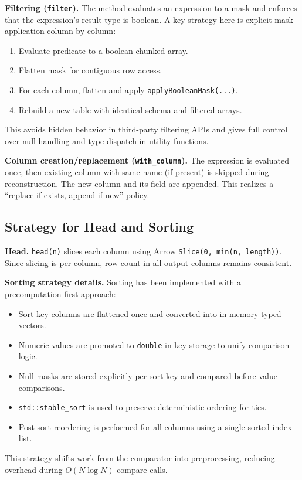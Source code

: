 \documentclass[11pt,a4paper]{article}
\begin{document}
\textbf{Filtering (\texttt{filter}).} The method evaluates an expression to a mask and enforces that the expression's result type is boolean. A key strategy here is explicit mask application column-by-column:
\begin{enumerate}[leftmargin=*]
	\item Evaluate predicate to a boolean chunked array.
	\item Flatten mask for contiguous row access.
	\item For each column, flatten and apply \texttt{applyBooleanMask(...)}.
	\item Rebuild a new table with identical schema and filtered arrays.
\end{enumerate}
This avoids hidden behavior in third-party filtering APIs and gives full control over null handling and type dispatch in utility functions.

\textbf{Column creation/replacement (\texttt{with\_column}).} The expression is evaluated once, then existing column with same name (if present) is skipped during reconstruction. The new column and its field are appended. This realizes a ``replace-if-exists, append-if-new'' policy.

\subsection{Strategy for Head and Sorting}

\textbf{Head.} \texttt{head(n)} slices each column using Arrow \texttt{Slice(0, min(n, length))}. Since slicing is per-column, row count in all output columns remains consistent.

\textbf{Sorting strategy details.} Sorting has been implemented with a precomputation-first approach:
\begin{itemize}[leftmargin=*]
	\item Sort-key columns are flattened once and converted into in-memory typed vectors.
	\item Numeric values are promoted to \texttt{double} in key storage to unify comparison logic.
	\item Null masks are stored explicitly per sort key and compared before value comparisons.
	\item \texttt{std::stable\_sort} is used to preserve deterministic ordering for ties.
	\item Post-sort reordering is performed for all columns using a single sorted index list.
\end{itemize}
This strategy shifts work from the comparator into preprocessing, reducing overhead during \(O(N \log N)\) compare calls.
\end{document}
